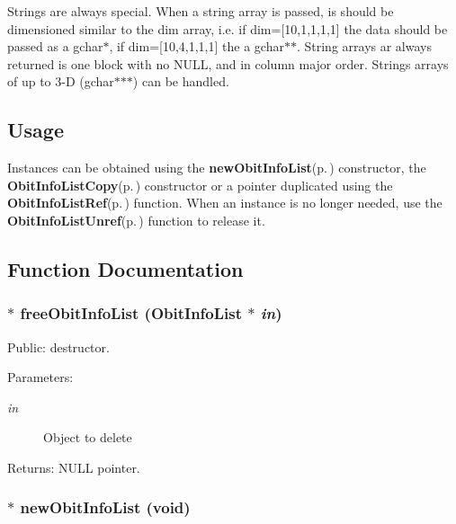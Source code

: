 Strings are always special. When a string array is passed, is should be dimensioned similar to the dim array, i.e. if dim=[10,1,1,1,1] the data should be passed as a gchar$\ast$, if dim=[10,4,1,1,1] the a gchar$\ast$$\ast$. String arrays ar always returned is one block with no NULL, and in column major order. Strings arrays of up to 3-D (gchar$\ast$$\ast$$\ast$) can be handled.\subsection{Usage}\label{ObitInfoList_8h_ObitInfoListUsage}
Instances can be obtained using the {\bf new\-Obit\-Info\-List}{\rm (p.\,\pageref{ObitInfoList_8c_a2})} constructor, the {\bf Obit\-Info\-List\-Copy}{\rm (p.\,\pageref{ObitInfoList_8c_a4})} constructor or a pointer duplicated using the {\bf Obit\-Info\-List\-Ref}{\rm (p.\,\pageref{ObitInfoList_8c_a5})} function. When an instance is no longer needed, use the {\bf Obit\-Info\-List\-Unref}{\rm (p.\,\pageref{ObitInfoList_8c_a6})} function to release it.

\subsection{Function Documentation}
\subsubsection{$\ast$ free\-Obit\-Info\-List ({\bf Obit\-Info\-List} $\ast$ {\em in})}\label{ObitInfoList_8h_a1}


Public: destructor. 

\begin{Desc}
\item[Parameters:]
\begin{description}
\item[{\em in}]Object to delete \end{description}
\end{Desc}
\begin{Desc}
\item[Returns:]NULL pointer. \end{Desc}
\subsubsection{$\ast$ new\-Obit\-Info\-List (void)}\label{ObitInfoList_8h_a0}


